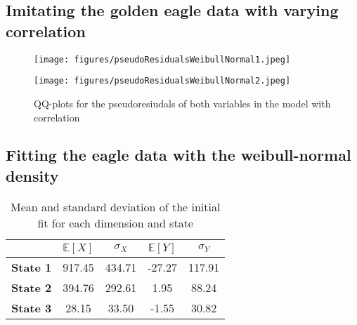 \subsection{Imitating the golden eagle data with varying correlation}
\begin{figure}[h]
  \centering
  \begin{minipage}[b]{0.49\textwidth}
    \texttt{[image: figures/pseudoResidualsWeibullNormal1.jpeg]}
  \end{minipage}
  \hfill
  \begin{minipage}[b]{0.49\textwidth}
    \texttt{[image: figures/pseudoResidualsWeibullNormal2.jpeg]}
  \end{minipage}
  \caption{QQ-plots for the pseudoresiudals of both variables in the model with correlation}
  \label{combinedQQPlotsCorrelation}
\end{figure}
\subsection{Fitting the eagle data with the weibull-normal density}
\begin{table}[ht]
  \centering
  \begin{tabular}{lcccc}
    \hline
    & $\mathbb{E}\left[X\right]$ & $\sigma_X$ & $\mathbb{E}\left[Y\right]$ & $\sigma_Y$ \\ 
    \hline
    \textbf{State 1} & 917.45 & 434.71 & -27.27 & 117.91 \\ 
    \textbf{State 2} & 394.76 & 292.61 & 1.95 & 88.24 \\ 
    \textbf{State 3} & 28.15 & 33.50 & -1.55 & 30.82 \\ 
     \hline
  \end{tabular}
  \caption{Mean and standard deviation of the initial fit for each dimension and state}
  \label{finalFitMeans}
\end{table}
\newpage
